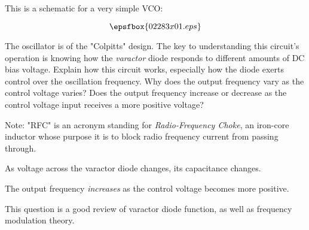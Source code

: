

This is a schematic for a very simple VCO:

$$\epsfbox{02283x01.eps}$$

The oscillator is of the "Colpitts" design.  The key to understanding this circuit's operation is knowing how the {\it varactor} diode responds to different amounts of DC bias voltage.  Explain how this circuit works, especially how the diode exerts control over the oscillation frequency.  Why does the output frequency vary as the control voltage varies?  Does the output frequency increase or decrease as the control voltage input receives a more positive voltage?

\vskip 10pt

Note: "RFC" is an acronym standing for {\it Radio-Frequency Choke}, an iron-core inductor whose purpose it is to block radio frequency current from passing through.







As voltage across the varactor diode changes, its capacitance changes.

The output frequency {\it increases} as the control voltage becomes more positive.







This question is a good review of varactor diode function, as well as frequency modulation theory.




